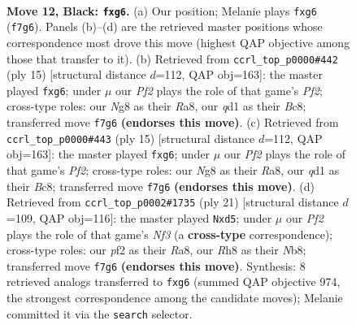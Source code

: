 \documentclass[11pt]{article}
\begin{document}
\clearpage

\begin{figure}[p]\centering
\begin{subfigure}{0.46\textwidth}\centering
\resizebox{\linewidth}{!}{%
\newchessgame
\chessboard[
  setfen={2kr1bnr/pp1b1p1p/1qn1p1P1/3pP3/1P1P2P1/P4N2/5P2/RNBQKB1R b KQ - 0 12},
  showmover=false,
  pgfstyle=straightmove, color=movearrow, markmove={f7-g6}
]}
\caption{}
\end{subfigure}\hfill
\begin{subfigure}{0.46\textwidth}\centering
\resizebox{\linewidth}{!}{%
\newchessgame
\chessboard[
  setfen={r1bq1rk1/pp2ppbp/n4nP1/2Pp4/2P5/2N2N2/PP2PPP1/R1BQKB1R b KQ - 0 8},
  showmover=false,
  pgfstyle=straightmove, color=movearrow, markmove={f7-g6}
]}
\caption{}
\end{subfigure}
\\[4pt]
\begin{subfigure}{0.46\textwidth}\centering
\resizebox{\linewidth}{!}{%
\newchessgame
\chessboard[
  setfen={r1bq1rk1/pp2ppbp/n4nP1/2Pp4/2P5/2N2N2/PP2PPP1/R1BQKB1R b KQ - 0 8},
  showmover=false,
  pgfstyle=straightmove, color=movearrow, markmove={f7-g6}
]}
\caption{}
\end{subfigure}\hfill
\begin{subfigure}{0.46\textwidth}\centering
\resizebox{\linewidth}{!}{%
\newchessgame
\chessboard[
  setfen={rn1qkb1r/1b3pp1/p3pn1p/1p1P4/3N2P1/P1N1BP2/1PPQ3P/R3KB1R b KQkq - 0 11},
  showmover=false,
  pgfstyle=straightmove, color=movearrow, markmove={f6-d5}
]}
\caption{}
\end{subfigure}
\caption{\textbf{Move 12, Black: \texttt{fxg6}.} (a) Our position; Melanie plays \texttt{fxg6} (\texttt{f7g6}). Panels (b)--(d) are the retrieved master positions whose correspondence most drove this move (highest QAP objective among those that transfer to it). (b) Retrieved from \texttt{ccrl\_top\_p0000\#442} (ply 15) [structural distance $d$=112, QAP obj=163]: the master played \texttt{fxg6}; under $\mu$ our \emph{Pf2} plays the role of that game's \emph{Pf2}; cross-type roles: our \emph{N}g8 as their \emph{R}a8, our \emph{q}d1 as their \emph{B}c8; transferred move \texttt{f7g6} \textbf{(endorses this move)}. (c) Retrieved from \texttt{ccrl\_top\_p0000\#443} (ply 15) [structural distance $d$=112, QAP obj=163]: the master played \texttt{fxg6}; under $\mu$ our \emph{Pf2} plays the role of that game's \emph{Pf2}; cross-type roles: our \emph{N}g8 as their \emph{R}a8, our \emph{q}d1 as their \emph{B}c8; transferred move \texttt{f7g6} \textbf{(endorses this move)}. (d) Retrieved from \texttt{ccrl\_top\_p0002\#1735} (ply 21) [structural distance $d$=109, QAP obj=116]: the master played \texttt{Nxd5}; under $\mu$ our \emph{Pf2} plays the role of that game's \emph{Nf3} (a \textbf{cross-type} correspondence); cross-type roles: our \emph{p}f2 as their \emph{R}a8, our \emph{R}h8 as their \emph{N}b8; transferred move \texttt{f7g6} \textbf{(endorses this move)}. Synthesis: 8 retrieved analogs transferred to \texttt{fxg6} (summed QAP objective 974, the strongest correspondence among the candidate moves); Melanie committed it via the \texttt{search} selector.}
\label{fig:thought-m23}
\end{figure}
\end{document}
